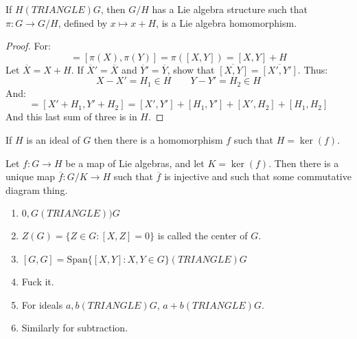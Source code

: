 \documentclass[crop=false,class=book,oneside]{standalone}                      %
\begin{document}
        \begin{theorem}
            If $H(TRIANGLE)G$, then $G/H$ has a Lie algebra structure such that
            $\pi:G\rightarrow{G}/H$, defined by $x\mapsto{x+H}$, is a Lie
            algebra homomorphism.
        \end{theorem}
        \begin{proof}
            For:
            \begin{equation}
                [X+H,Y+H]=[\pi(X),\pi(Y)]=\pi([X,Y])=[X,Y]+H
            \end{equation}
            Let $\overline{X}=X+H$. If $\overline{X}'=\overline{X}$ and
            $\overline{Y}'=\overline{Y}$, show that
            $\overline{[X,Y]}=\overline{[X',Y']}$. Thus:
            \begin{equation}
                X-X'=H_{1}\in{H}\quad\quad
                Y-Y'=H_{2}\in{H}
            \end{equation}
            And:
            \begin{equation}
                [X,Y]=[X'+H_{1},Y'+H_{2}]
                =[X',Y']+[H_{1},Y']+[X',H_{2}]+[H_{1},H_{2}]
            \end{equation}
            And this last sum of three is in $H$.
        \end{proof}
        \begin{theorem}
            If $H$ is an ideal of $G$ then there is a homomorphism $f$
            such that $H=\ker(f)$.
        \end{theorem}
        \begin{theorem}
            Let $f:G\rightarrow{H}$ be a map of Lie algebras, and let
            $K=\ker(f)$. Then there is a unique map
            $\overline{f}:G/K\rightarrow{H}$ such that $\overline{f}$ is
            injective and such that some commutative diagram thing.
        \end{theorem}
        \begin{example}
            \begin{enumerate}
                \item $0,G(TRIANGLE))G$
                \item $Z(G)=\{Z\in{G}:[X,Z]=0\}$ is called the center of $G$.
                \item $[G,G]=\textrm{Span}\{[X,Y]:X,Y\in{G}\}(TRIANGLE)G$
                \item Fuck it.
                \item For ideals $a,b(TRIANGLE)G$, $a+b(TRIANGLE)G$.
                \item Similarly for subtraction.
            \end{enumerate}
        \end{example}
\end{document}
